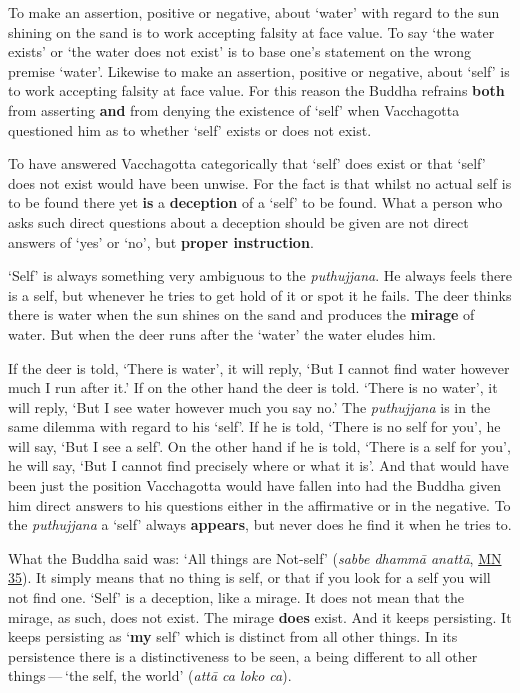 To make an assertion, positive or negative, about `water' with regard to the sun shining on the sand is to work accepting falsity at face value. To say `the water exists' or `the water does not exist' is to base one's statement on the wrong premise `water'. Likewise to make an assertion, positive or negative, about `self' is to work accepting falsity at face value. For this reason the Buddha refrains \textbf{both} from asserting \textbf{and} from denying the existence of `self' when Vacchagotta questioned him as to whether `self' exists or does not exist.

To have answered Vacchagotta categorically that `self' does exist or that `self' does not exist would have been unwise. For the fact is that whilst no actual self is to be found there yet \textbf{is} a \textbf{deception} of a `self' to be found. What a person who asks such direct questions about a deception should be given are not direct answers of `yes' or `no', but \textbf{proper instruction}.

`Self' is always something very ambiguous to the \emph{puthujjana}. He always feels there is a self, but whenever he tries to get hold of it or spot it he fails. The deer thinks there is water when the sun shines on the sand and produces the \textbf{mirage} of water. But when the deer runs after the `water' the water eludes him.

If the deer is told, `There is water', it will reply, `But I cannot find water however much I run after it.' If on the other hand the deer is told. `There is no water', it will reply, `But I see water however much you say no.' The \emph{puthujjana} is in the same dilemma with regard to his `self'. If he is told, `There is no self for you', he will say, `But I see a self'. On the other hand if he is told, `There is a self for you', he will say, `But I cannot find precisely where or what it is'. And that would have been just the position Vacchagotta would have fallen into had the Buddha given him direct answers to his questions either in the affirmative or in the negative. To the \emph{puthujjana} a `self' always \textbf{appears}, but never does he find it when he tries to.

What the Buddha said was: `All things are Not-self' (\emph{sabbe dhammā anattā}, \href{https://suttacentral.net/mn35/en/sujato}{MN 35}). It simply means that no thing is self, or that if you look for a self you will not find one. `Self' is a deception, like a mirage. It does not mean that the mirage, as such, does not exist. The mirage \textbf{does} exist. And it keeps persisting. It keeps persisting as `\textbf{my} self' which is distinct from all other things. In its persistence there is a distinctiveness to be seen, a being different to all other things --- `the self, the world' (\emph{attā ca loko ca}).

